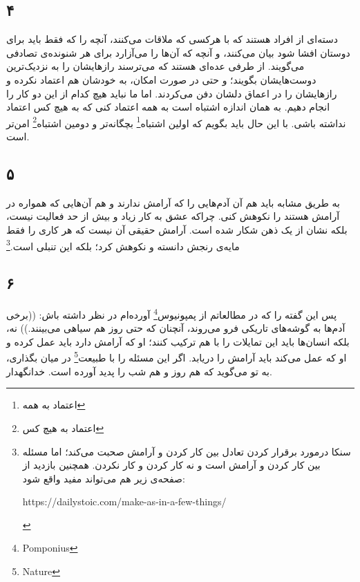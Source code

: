 \documentclass{article}
\begin{document}
    \subsection*{۴}
    دسته‌ای از افراد هستند که با هرکسی که ملاقات می‌کنند، آنچه را که فقط باید برای دوستان افشا شود بیان می‌کنند، و آنچه که آن‌ها را می‌آزارد برای هر شنونده‌ی تصادفی می‌گویند.
    از طرفی عده‌ای هستند که می‌ترسند رازهایشان را به نزدیک‌ترین دوست‌هایشان بگویند؛ و حتی در صورت امکان، به خودشان هم اعتماد نکرده و رازهایشان را در اعماق دلشان دفن می‌کردند.
    اما ما نباید هیچ کدام از این دو کار را انجام دهیم.
    به همان اندازه اشتباه است به همه اعتماد کنی که به هیچ کس اعتماد نداشته باشی.
    با این حال باید بگویم که اولین اشتباه\footnote{اعتماد به همه} بچگانه‌تر و دومین اشتباه\footnote{اعتماد به هیچ کس} امن‌تر است.
    \subsection*{۵}
    به طریق مشابه باید هم آن آدم‌هایی را که آرامش ندارند و هم آن‌هایی که همواره در آرامش هستند را نکوهش کنی.
    چراکه عشق به کار زیاد و بیش از حد فعالیت نیست، بلکه نشان از یک ذهن شکار شده است.
    آرامش حقیقی آن نیست که هر کاری را فقط مایه‌ی رنجش دانسته و نکوهش کرد؛ بلکه این تنبلی است.\footnote{سنکا درمورد برقرار کردن تعادل بین کار کردن و آرامش صحبت می‌کند؛ اما مسئله بین کار کردن و آرامش است و نه کار کردن و کار نکردن. همچنین بازدید از صفحه‌ی زیر هم می‌تواند مفید واقع شود:\newline \begin{LTR}https://dailystoic.com/make-as-in-a-few-things/\end{LTR}}
    \subsection*{۶}
    پس این گفته را که در مطالعاتم از پمپونیوس\footnote{Pomponius} آورده‌ام در نظر داشته باش: ((برخی آدم‌ها به گوشه‌های تاریکی فرو می‌روند، آنچنان که حتی روز هم سیاهی می‌بینند.))
    نه، بلکه انسان‌ها باید این تمایلات را با هم ترکیب کنند؛ او که آرامش دارد باید عمل کرده و او که عمل می‌کند باید آرامش را دریابد.
    اگر این مسئله را با طبیعت\footnote{Nature} در میان بگذاری،‌ به تو می‌گوید که هم روز و هم شب را پدید آورده است.
    خدانگهدار.
\end{document}
